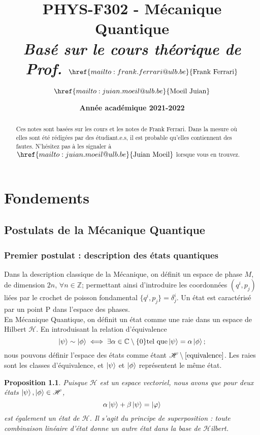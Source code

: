\documentclass{report}
\title{\textbf{PHYS-F302 - Mécanique Quantique} \\ \textit{Basé sur le cours théorique de Prof. $\href{mailto:frank.ferrari@ulb.be}{\text{Frank Ferrari}}$}}
\author{$\href{mailto:juian.moeil@ulb.be}{\text{Moeil Juian}}$}
\date{\textbf{Année académique 2021-2022}}
\numberwithin{equation}{part}
\newtheorem{Property}[theorem]{Proposition}
\begin{document}
\maketitle

\begin{abstract}
    Ces notes sont basées sur les cours et les notes de Frank Ferrari. Dans la mesure où elles sont été rédigées par des étudiant.e.s, il est probable qu'elles contiennent des fautes. N'hésitez pas à les signaler à $\href{mailto:juian.moeil@ulb.be}{\text{Juian Moeil}}$ lorsque vous en trouvez.
\end{abstract}
\newpage

\part{Fondements}

\chapter{Postulats de la Mécanique Quantique}

\section{Premier postulat : description des états quantiques}

Dans la description classique de la Mécanique, on définit un espace de phase $M$, de dimension $2n$, $\forall n\in\mathbb{Z}$; permettant ainsi d'introduire les coordonnées $\left(q^i,p_j\right)$ liées par le crochet de poisson fondamental $\{q^i,p_j\}=\delta^i_j$. Un état est caractérisé par un point P dans l'espace des phases.\\

En Mécanique Quantique, on définit un état comme une raie dans un espace de Hilbert $\mathcal{H}$. En introduisant la relation d'équivalence
\begin{equation}
\label{equivalence}
    \ket{\psi} \sim \ket{\phi} \iff \exists \alpha\in\mathbb{C}\setminus\{0\} \text{tel que} \ket{\psi}=\alpha\ket{\phi} ;
\end{equation}
nous pouvons définir l'espace des états comme étant $\mathcal{H}\setminus\ref{equivalence}$. Les raies sont les classes d'équivalence, et $\ket{\psi}$ et $\ket{\phi}$ représentent le même état.\\

\begin{Property}
    Puisque $\mathcal{H}$ est un espace vectoriel, nous avons que pour deux états $\ket{\psi},\ket{\phi} \in\mathcal{H}$, 
    \begin{equation}
        \alpha\ket{\psi}+\beta\ket{\psi}=\ket{\varphi}
    \end{equation}
    est également un état de $\mathcal{H}$. Il s'agit du principe de superposition : toute combinaison linéaire d'état donne un autre état dans la base de $\mathcal{H}$ilbert.
    \label{Superposition}
\end{Property}
\end{document}
